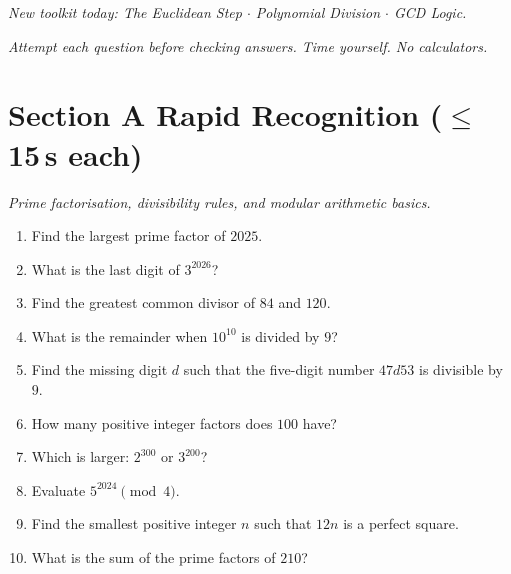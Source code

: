 \documentclass[11pt,a4paper]{article}
\begin{document}
\noindent\textit{New toolkit today: The Euclidean Step $\cdot$ Polynomial Division $\cdot$ GCD Logic.}

\vspace{2pt}
\noindent\textit{Attempt each question before checking answers. Time yourself. No calculators.}

\section*{Section A \quad Rapid Recognition \hfill{\normalfont\small($\leq$15\,s each)}}

\noindent\textit{Prime factorisation, divisibility rules, and modular arithmetic basics.}

\begin{enumerate}

\item Find the largest prime factor of $2025$.

\item What is the last digit of $3^{2026}$?

\item Find the greatest common divisor of $84$ and $120$.

\item What is the remainder when $10^{10}$ is divided by $9$?

\item Find the missing digit $d$ such that the five-digit number $47d53$ is divisible by $9$.

\item How many positive integer factors does $100$ have?

\item Which is larger: $2^{300}$ or $3^{200}$?

\item Evaluate $5^{2024} \pmod 4$.

\item Find the smallest positive integer $n$ such that $12n$ is a perfect square.

\item What is the sum of the prime factors of $210$?

\end{enumerate}
\end{document}
